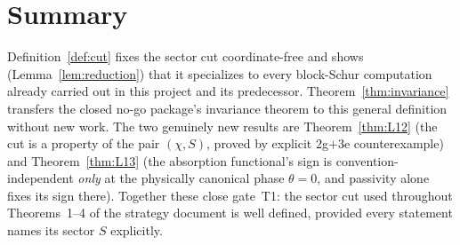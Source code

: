 \documentclass[11pt,a4paper]{article}
\theoremstyle{remark}
\begin{document}
\section{Summary}

Definition~\ref{def:cut} fixes the sector cut coordinate-free and shows
(Lemma~\ref{lem:reduction}) that it specializes to every block-Schur
computation already carried out in this project and its predecessor.
Theorem~\ref{thm:invariance} transfers the closed no-go package's
invariance theorem to this general definition without new work. The two
genuinely new results are Theorem~\ref{thm:L12} (the cut is a property of
the pair $(\chi,S)$, proved by explicit $2$g$+3$e counterexample) and
Theorem~\ref{thm:L13} (the absorption functional's sign is
convention-independent \emph{only} at the physically canonical phase
$\theta=0$, and passivity alone fixes its sign there). Together these
close gate~T1: the sector cut used throughout Theorems~1--4 of the
strategy document is well defined, provided every statement names its
sector $S$ explicitly.
\end{document}
